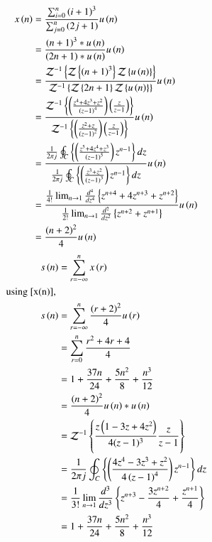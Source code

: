 \documentclass[journal,12pt,twocolumn]{IEEEtran}
\begin{document}
\begin{align}
    x\left(n\right) & = \frac{\sum_{i=0}^{n} \left(i+1\right)^{3}}{\sum_{j=0}^{n} \left(2j+1\right)} u\left(n\right)  \\
    & = \frac{\left(n+1\right)^{3} * u\left(n\right)}{\left(2n+1\right) * u\left(n\right)}u\left(n\right)\\
    & = \frac{\mathcal{Z}^{-1}\left\{\mathcal{Z}\left\{\left(n+1\right)^{3}\right\}\mathcal{Z}\left\{u\left(n\right)\right\}\right\}}{\mathcal{Z}^{-1}\left\{\mathcal{Z}\left\{{2n+1}\right\} \mathcal{Z}\left\{u\left(n\right)\right\}\right\}} u\left(n\right)\\
    & = \frac{\mathcal{Z}^{-1}\left\{\left(\frac{z^4+4z^3+z^2}{\left(z-1\right)^4}\right)\left(\frac{z}{z-1}\right)\right\}}{\mathcal{Z}^{-1}\left\{ \left(\frac{z^2 + z}{\left(z-1\right)^2}\right)\left(\frac{z}{z-1}\right)\right\}} u\left(n\right)\\
    & = \frac{\frac{1}{2\pi j} \oint_C  \left\{\left(\frac{z^5+4z^4+z^3}{\left(z-1\right)^5}\right)z^{n-1}\right\} dz}{\frac{1}{2\pi j} \oint_C  \left\{ \left(\frac{z^3 + z^2}{\left(z-1\right)^3}\right)z^{n-1}\right\} dz}u\left(n\right)\\
    & = \frac{\frac{1}{4!} \lim_{n\rightarrow1}{\frac{d^4}{dz^4} \left\{z^{n+4}+4z^{n+3}+z^{n+2}\right\}}}{\frac{1}{2!} \lim_{n\rightarrow1}{\frac{d^2}{dz^2} \left\{z^{n+2}+z^{n+1}\right\}}}u\left(n\right)\\
    & = \frac{\left(n + 2\right)^{2}}{4} u\left(n\right) \label{x(n)}
\end{align}
\begin{align}
    s\left(n\right) & = \sum_{r=-\infty}^{n} x\left(r\right)\\
    \notag \text{using \eqref{x(n)}, } \\
    s\left(n\right) & = \sum_{r=-\infty}^{n} \frac{\left(r+2\right)^{2}}{4} u\left(r\right) \\
    & = \sum_{r=0}^{n}\frac{r^2 + 4r + 4}{4} \\
    & = 1 + \frac{37n}{24} + \frac{5n^2}{8} + \frac{n^3}{12}\\
    & = \frac{\left(n+2\right)^2}{4} u\left(n\right)* u\left(n\right)\\
    & = \mathcal{Z}^{-1}\left\{\frac{z \left(1 - 3 z + 4 z^2\right)}{4 (z - 1)^3}\frac{z}{z-1}\right\}\\
    & = \frac{1}{2\pi j} \oint_C  \left\{\left(\frac{4z^4-3z^3 + z^2}{4\left(z-1\right)^4}\right)z^{n-1}\right\} dz\\
    & = \frac{1}{3!} \lim_{n\rightarrow1}{\frac{d^3}{dz^3} \left\{z^{n+3}-\frac{3z^{n+2}}{4}+\frac{z^{n+1}}{4}\right\}}\\
    & = 1 + \frac{37n}{24} + \frac{5n^2}{8} + \frac{n^3}{12}
\end{align}
\end{document}
